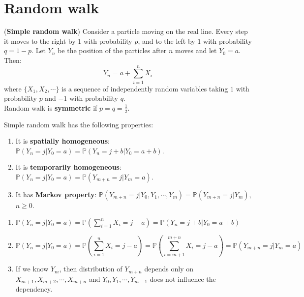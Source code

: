\documentclass{huhtakm-template-book}
\newcommand{\prob}{\mathbb{P}}
\begin{document}
\appendix
\renewcommand{\thechapter}{\Alph{chapter}}

\chapter{Random walk}
\label{Appendix A Simple random walk}
\begin{eg}(\textbf{Simple random walk})
	Consider a particle moving on the real line. Every step it moves to the right by $1$ with probability $p$, and to the left by $1$ with probability $q=1-p$. Let $Y_{n}$ be the position of the particles after $n$ moves and let $Y_{0}=a$. Then:
	\begin{equation*}
		Y_{n}=a+\sum_{i=1}^{n}X_{i}
	\end{equation*}
	where $\{X_{1},X_{2},\cdots\}$ is a sequence of independently random variables taking $1$ with probability $p$ and $-1$ with probability $q$.\\
	Random walk is \textbf{symmetric} if $p=q=\frac{1}{2}$.
\end{eg}
\begin{lem}
	\label{Appendix A (Lemma) Simple random walk properties}
	Simple random walk has the following properties:
	\begin{enumerate}
		\item It is \textbf{spatially homogeneous}: $\prob(Y_{n}=j|Y_{0}=a)=\prob(Y_{n}=j+b|Y_{0}=a+b)$.
		\item It is \textbf{temporarily homogeneous}: $\prob(Y_{n}=j|Y_{0}=a)=\prob(Y_{m+n}=j|Y_{m}=a)$.
		\item It has \textbf{Markov property}: $\prob(Y_{m+n}=j|Y_{0},Y_{1},\cdots,Y_{m})=\prob(Y_{m+n}=j|Y_{m})$, $n\geq 0$.
	\end{enumerate}
\end{lem}
\begin{proofing}
	\begin{enumerate}
		\item $\prob(Y_{n}=j|Y_{0}=a)=\prob(\sum_{i=1}^{n}X_{i}=j-a)=\prob(Y_{n}=j+b|Y_{0}=a+b)$
		\item 
		\begin{equation*}
			\prob(Y_{n}=j|Y_{0}=a)=\prob\left(\sum_{i=1}^{n}X_{i}=j-a\right)=\prob\left(\sum_{i=m+1}^{m+n}X_{i}=j-a\right)=\prob(Y_{m+n}=j|Y_{m}=a)
		\end{equation*}
		\item If we know $Y_{m}$, then distribution of $Y_{m+n}$ depends only on $X_{m+1},X_{m+2},\cdots,X_{m+n}$ and $Y_{0},Y_{1},\cdots,Y_{m-1}$ does not influence the dependency.
	\end{enumerate}
\end{proofing}
\end{document}
